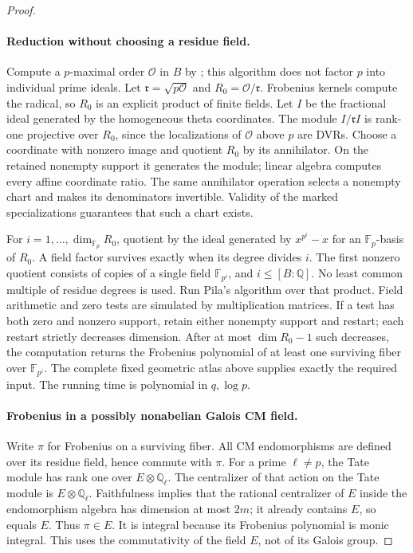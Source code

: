 \documentclass[11pt]{article}
\theoremstyle{definition}
\theoremstyle{remark}
\begin{document}
\begin{proof}
\paragraph{Reduction without choosing a residue field.}
Compute a $p$-maximal order $\mathcal O$ in $B$ by
\cite[Algorithm~6.1 and Proposition~6.2, pp.~246--247]{BuchmannLenstra1994}; this algorithm does not factor $p$ into
individual prime ideals.  Let
$\mathfrak r=\sqrt{p\mathcal O}$ and $R_0=\mathcal O/\mathfrak r$.
Frobenius kernels compute the radical, so $R_0$ is an explicit product of
finite fields.  Let $I$ be the fractional ideal generated by the homogeneous
theta coordinates.  The module $I/\mathfrak r I$ is rank-one projective over
$R_0$, since the localizations of $\mathcal O$ above $p$ are DVRs.
Choose a coordinate with nonzero image and quotient $R_0$ by its
annihilator.  On the retained nonempty support it generates the module;
linear algebra computes every affine coordinate ratio.  The same
annihilator operation selects a nonempty chart and makes its denominators
invertible.  Validity of the marked specializations guarantees that such a
chart exists.

For $i=1,\ldots,\dim_{\mathbb F_p}R_0$, quotient by the ideal generated by
$x^{p^i}-x$ for an $\mathbb F_p$-basis of $R_0$.  A field factor survives
exactly when its degree divides $i$.  The first nonzero quotient consists of
copies of a single field $\mathbb F_{p^i}$, and
$i\leq[B:\mathbb Q]$.  No least common multiple of residue degrees is used.
Run Pila's algorithm over that product.  Field arithmetic and zero tests
are simulated by multiplication matrices.  If a test has both zero and
nonzero support, retain either nonempty support and restart; each restart
strictly decreases dimension.  After at most $\dim R_0-1$ such decreases,
the computation returns the Frobenius polynomial of at least one surviving
fiber over $\mathbb F_{p^i}$.  The complete fixed geometric atlas above
supplies exactly the required input.  The running time is polynomial in
$q,\log p$.

\paragraph{Frobenius in a possibly nonabelian Galois CM field.}
Write $\pi$ for Frobenius on a surviving fiber.  All CM endomorphisms are
defined over its residue field, hence commute with $\pi$.  For a prime
$\ell\ne p$, the Tate module has rank one over $E\otimes\mathbb Q_\ell$.
The centralizer of that action on the Tate module is
$E\otimes\mathbb Q_\ell$.  Faithfulness implies that the rational
centralizer of $E$ inside the endomorphism algebra has dimension at most
$2m$; it already contains $E$, so equals $E$.  Thus $\pi\in E$.
It is integral because its Frobenius polynomial is monic integral.
This uses the commutativity of the field $E$, not of its Galois group.


\end{proof}
\end{document}
